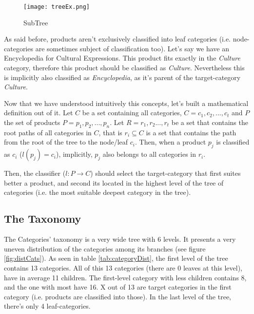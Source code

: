 \begin{figure}[!htbp]
  \centering
  \texttt{[image: treeEx.png]}\\
  \caption{SubTree}
  \label{fig:subtree}
\end{figure}

As said before, products aren't exclusively classified into leaf categories (i.e. node-categories are sometimes subject of classification too). Let's say we have an Encyclopedia for Cultural Expressions. This product fits exactly in the \textit{Culture} category, therefore this product should be classified as \textit{Culture}. Nevertheless this is implicitly also classified as \textit{Encyclopedia}, as it's parent of the target-category \textit{Culture}. 

Now that we have understood intuitively this concepts, let's built a mathematical definition out of it. Let $C$ be a set containing all categories, $C = {c_1, c_2, ..., c_t}$ and $P$ the set of products $P = {p_1, p_2, ..., p_n}$. Let $R = {r_1, r_2..., r_t}$ be a set that contains the root paths of all categories in $C$, that is $r_i \subseteq C$ is a set that contains the path from the root of the tree to the node/leaf $c_i$. Then, when a product $p_j$ is classified as $c_i$ ($l(p_j) = c_i$), implicitly, $p_j$ also belongs to all categories in $r_i$.

Then, the classifier ($l: P \rightarrow C$) should select the target-category that first suites better a product, and second its located in the highest level of the tree of categories (i.e. the most suitable deepest category in the tree).

\subsection{The Taxonomy}
The Categories' taxonomy is a very wide tree with 6 levels. It presents a very uneven distribution of the categories among its branches (see figure \ref{fig:distCats}). As seen in table \ref{tab:categoryDist}, the first level of the tree contains 13 categories. All of this 13 categories (there are 0 leaves at this level), have in average 11 children. The first-level category with less children contains 8, and the one with most have 16. X out of 13 are target categories in the first category (i.e. products are classified into those).
In the last level of the tree, there's only 4 leaf-categories.

